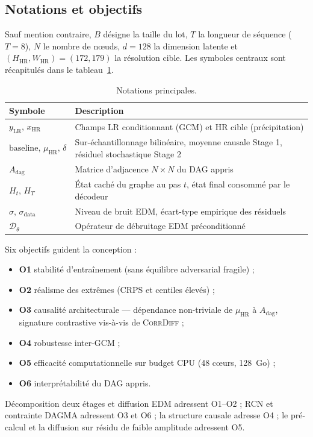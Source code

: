 \documentclass[14pt,a4paper,openany]{extreport}
\theoremstyle{definition}
\newcommand{\CorrDiff}{\textsc{CorrDiff}}
\newcommand{\LR}{\ensuremath{\text{LR}}}
\newcommand{\HR}{\ensuremath{\text{HR}}}
\newcommand{\xHR}{\ensuremath{x_{\HR}}}
\newcommand{\yLR}{\ensuremath{y_{\LR}}}
\newcommand{\muHR}{\ensuremath{\mu_{\HR}}}
\newcommand{\Adag}{\ensuremath{A_{\mathrm{dag}}}}
\newcommand{\Ht}{\ensuremath{H_t}}
\newcommand{\HT}{\ensuremath{H_T}}
\begin{document}
\subsection{Notations et objectifs}
\label{ssec:oracle-notations}

Sauf mention contraire, $B$ désigne la taille du lot, $T$ la longueur de séquence ($T=8$), $N$ le nombre de nœuds, $d=128$ la dimension latente et $(H_{\HR}, W_{\HR})=(172,179)$ la résolution cible. Les symboles centraux sont récapitulés dans le tableau~\ref{tab:notations}.

\begin{table}[ht]
  \centering
  \small
  \caption{Notations principales.}
  \label{tab:notations}
  \begin{tabularx}{\linewidth}{l X}
    \toprule
    \textbf{Symbole} & \textbf{Description} \\
    \midrule
    $\yLR,\,\xHR$ & Champs LR conditionnant (GCM) et HR cible (précipitation) \\
    $\mathrm{baseline},\,\muHR,\,\delta$ & Sur-échantillonnage bilinéaire, moyenne causale Stage 1, résiduel stochastique Stage 2 \\
    $\Adag$ & Matrice d'adjacence $N\times N$ du DAG appris \\
    $\Ht,\,\HT$ & État caché du graphe au pas $t$, état final consommé par le décodeur \\
    $\sigma,\,\sigma_{\mathrm{data}}$ & Niveau de bruit EDM, écart-type empirique des résiduels \\
    $\mathcal{D}_\theta$ & Opérateur de débruitage EDM préconditionné \\
    \bottomrule
  \end{tabularx}
\end{table}

Six objectifs guident la conception :
\begin{itemize}[leftmargin=1.2em, itemsep=2pt]
    \item \textbf{O1} stabilité d'entraînement (sans équilibre adversarial fragile) ;
    \item \textbf{O2} réalisme des extrêmes (CRPS et centiles élevés) ;
    \item \textbf{O3} causalité architecturale --- dépendance non-triviale de $\muHR$ à $\Adag$, signature contrastive vis-à-vis de \CorrDiff{} ;
    \item \textbf{O4} robustesse inter-GCM ;
    \item \textbf{O5} efficacité computationnelle sur budget CPU (48 cœurs, 128~Go) ;
    \item \textbf{O6} interprétabilité du DAG appris.
\end{itemize}
Décomposition deux étages et diffusion EDM adressent O1--O2 ; RCN et contrainte DAGMA adressent O3 et O6 ; la structure causale adresse O4 ; le pré-calcul et la diffusion sur résidu de faible amplitude adressent O5.
\end{document}
